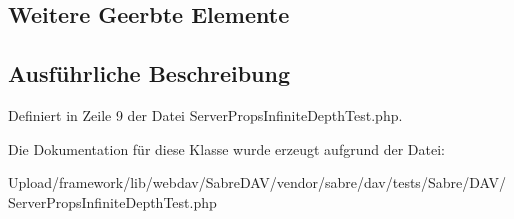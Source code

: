 \subsection*{Weitere Geerbte Elemente}


\subsection{Ausführliche Beschreibung}


Definiert in Zeile 9 der Datei Server\+Props\+Infinite\+Depth\+Test.\+php.



Die Dokumentation für diese Klasse wurde erzeugt aufgrund der Datei\+:\begin{DoxyCompactItemize}
\item 
Upload/framework/lib/webdav/\+Sabre\+D\+A\+V/vendor/sabre/dav/tests/\+Sabre/\+D\+A\+V/Server\+Props\+Infinite\+Depth\+Test.\+php\end{DoxyCompactItemize}
